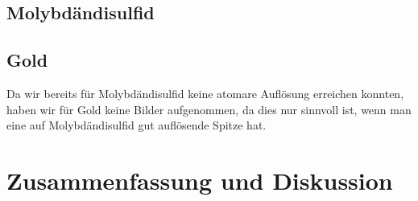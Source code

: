 \documentclass[12pt,listof=totoc]{scrartcl}
\newcommand{\code}[1]{\texttt{#1}}
\begin{document}
\subsection{Molybdändisulfid}



\subsection{Gold}

Da wir bereits für Molybdändisulfid keine atomare Auflösung erreichen konnten, haben wir für Gold keine Bilder aufgenommen, da dies nur sinnvoll ist, wenn man eine auf Molybdändisulfid gut auflösende Spitze hat. 

\newpage
\section{Zusammenfassung und Diskussion}
\label{diskussion}








%
%

\newpage
\listoffigures
\end{document}
